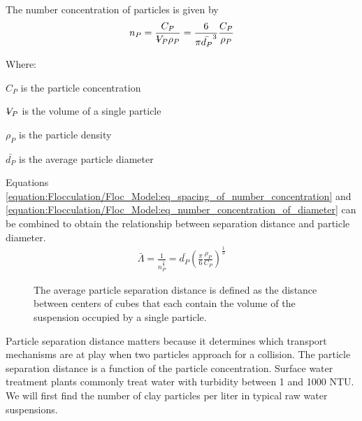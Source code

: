 \documentclass[letterpaper,10pt,english]{sphinxmanual}
\let\sphinxpxdimen\pdfpxdimen\else\newdimen\sphinxpxdimen
\begin{document}
The number concentration of particles is given by
\begin{equation}\label{equation:Flocculation/Floc_Model:eq_number_concentration_of_diameter}
\begin{split}n_P = \frac{C_P}{\rlap{--} V_P \rho_P} = \frac{6}{\pi \bar{d_P}^3} \frac{C_P}{\rho_P}\end{split}
\end{equation}
\begin{DUlineblock}{0em}
\item[] Where:
\item[] \(C_P\) is the particle concentration
\item[] \(\rlap{--} V_P\) is the volume of a single particle
\item[] \(\rho_P\) is the particle density
\item[] \(\bar{d_P}\) is the average particle diameter
\end{DUlineblock}

Equations \eqref{equation:Flocculation/Floc_Model:eq_spacing_of_number_concentration} and \eqref{equation:Flocculation/Floc_Model:eq_number_concentration_of_diameter} can be combined to obtain the relationship between separation distance and particle diameter.
\begin{equation}\label{equation:Flocculation/Floc_Model:eq_spacing_of_diameter}
\begin{split} \bar \Lambda  = \frac{1}{n_P^{\frac{1}{3}}} =  \bar{d_P} \left(\frac{\pi}{6}\frac{\rho_P}{C_P}\right)^{\frac{1}{3}}\end{split}
\end{equation}
\begin{figure}[htbp]
\centering
\capstart

\noindent\sphinxincludegraphics[width=200\sphinxpxdimen]{{Particle_separation}.png}
\caption{The average particle separation distance is defined as the distance between centers of cubes that each contain the volume of the suspension occupied by a single particle.}\label{\detokenize{Flocculation/Floc_Model:id32}}\label{\detokenize{Flocculation/Floc_Model:figure-particle-separation}}\end{figure}

Particle separation distance matters because it determines which transport mechanisms are at play when two particles approach for a collision. The particle separation distance is a function of the particle concentration. Surface water treatment plants commonly treat water with turbidity between 1 and 1000 NTU. We will first find the number of clay particles per liter in typical raw water suspensions.
\end{document}
